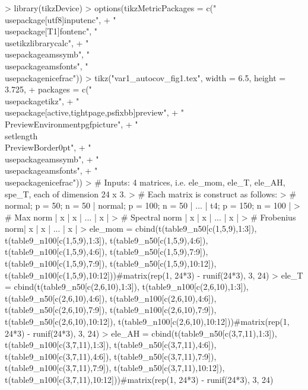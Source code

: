 \documentclass{article}
\begin{document}
\begin{Schunk}
\begin{Sinput}
> library(tikzDevice)
> options(tikzMetricPackages = c("\\usepackage[utf8]{inputenc}",
+     "\\usepackage[T1]{fontenc}", "\\usetikzlibrary{calc}",
+     "\\usepackage{amssymb}", "\\usepackage{amsfonts}", "\\usepackage{nicefrac}"))
> tikz("var1_autocov_fig1.tex", width = 6.5, height = 3.725,
+      packages = c("\\usepackage{tikz}",
+                  "\\usepackage[active,tightpage,psfixbb]{preview}",
+                  "\\PreviewEnvironment{pgfpicture}",
+                  "\\setlength\\PreviewBorder{0pt}",
+                  "\\usepackage{amssymb}",
+                  "\\usepackage{amsfonts}",
+                  "\\usepackage{nicefrac}"))
> # Inputs: 4 matrices, i.e. ele_mom, ele_T, ele_AH, spe_T, each of dimension 24 x 3.
> # Each matrix is construct as follows:
> #                normal; p = 50; n = 50 | normal; p = 100; n = 50 | ... | t4; p = 150; n = 100 |
> # Max norm      |            x          |         x               | ... |         x            |
> # Spectral norm |            x          |         x               | ... |         x            |
> # Frobenius norm|            x          |         x               | ... |         x            |
> ele_mom = cbind(t(table9_n50[c(1,5,9),1:3]), t(table9_n100[c(1,5,9),1:3]), t(table9_n50[c(1,5,9),4:6]), t(table9_n100[c(1,5,9),4:6]), t(table9_n50[c(1,5,9),7:9]), t(table9_n100[c(1,5,9),7:9]), t(table9_n50[c(1,5,9),10:12]), t(table9_n100[c(1,5,9),10:12]))#matrix(rep(1, 24*3) - runif(24*3), 3, 24)
> ele_T = cbind(t(table9_n50[c(2,6,10),1:3]), t(table9_n100[c(2,6,10),1:3]), t(table9_n50[c(2,6,10),4:6]), t(table9_n100[c(2,6,10),4:6]), t(table9_n50[c(2,6,10),7:9]), t(table9_n100[c(2,6,10),7:9]), t(table9_n50[c(2,6,10),10:12]), t(table9_n100[c(2,6,10),10:12]))#matrix(rep(1, 24*3) - runif(24*3), 3, 24)
> ele_AH = cbind(t(table9_n50[c(3,7,11),1:3]), t(table9_n100[c(3,7,11),1:3]), t(table9_n50[c(3,7,11),4:6]), t(table9_n100[c(3,7,11),4:6]), t(table9_n50[c(3,7,11),7:9]), t(table9_n100[c(3,7,11),7:9]), t(table9_n50[c(3,7,11),10:12]), t(table9_n100[c(3,7,11),10:12]))#matrix(rep(1, 24*3) - runif(24*3), 3, 24)

\end{Sinput}
\end{Schunk}
\end{document}

